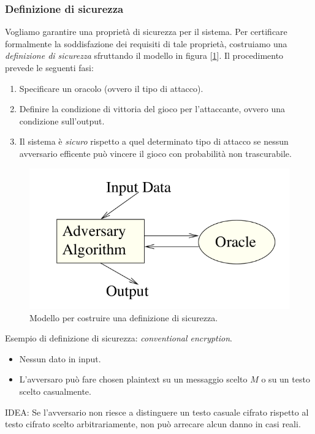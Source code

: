\documentclass[a4paper, 11pt, twoside, openright, fleqn]{report}
\begin{document}
\clearpage
\subsubsection{Definizione di sicurezza}
Vogliamo garantire una proprietà di sicurezza per il sistema. Per certificare formalmente la soddisfazione dei requisiti di tale proprietà, costruiamo una \emph{definizione di sicurezza} sfruttando il modello in figura [\ref{fig:modello-def-sicurezza}]. Il procedimento prevede le seguenti fasi:
\begin{enumerate}
	\item Specificare un oracolo (ovvero il tipo di attacco).
	\item Definire la condizione di vittoria del gioco per l'attaccante, ovvero una condizione sull'output.
	\item Il sistema è \emph{sicuro} rispetto a quel determinato tipo di attacco se nessun avversario efficente può vincere il gioco con probabilità non trascurabile.
\end{enumerate}
\begin{figure}[htp]
	\centering
	\includegraphics[width=.6\textwidth]{images/Definizione_sicurezza}
	\caption{Modello per costruire una definizione di sicurezza.}\label{fig:modello-def-sicurezza}
\end{figure}

\noindent Esempio di definizione di sicurezza: \emph{conventional encryption}.
\begin{itemize}
	\item Nessun dato in input.
	\item L'avversaro può fare chosen plaintext su un messaggio scelto $M$ o su un testo scelto casualmente.
\end{itemize}
IDEA: Se l'avversario non riesce a distinguere un testo casuale cifrato rispetto al testo cifrato scelto arbitrariamente, non può arrecare alcun danno in casi reali.
\end{document}
